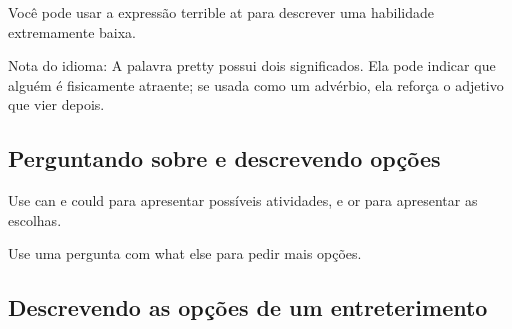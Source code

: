 Você pode usar a expressão terrible at para descrever uma habilidade extremamente baixa.

Nota do idioma: A palavra pretty possui dois significados. Ela pode indicar que alguém é fisicamente atraente; se usada como um advérbio, ela reforça o adjetivo que vier depois.

\subsection{Perguntando sobre e descrevendo opções}


Use can e could para apresentar possíveis atividades, e or para apresentar as escolhas.

Use uma pergunta com what else para pedir mais opções.

\subsection{Descrevendo as opções de um entreterimento}

